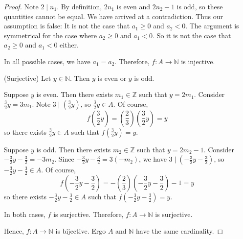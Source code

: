 \documentclass{article}
\newcommand{\Z}{\mathbb{Z}}
\newcommand{\N}{\mathbb{N}}
\theoremstyle{definition}
\begin{document}
\begin{solution}
\begin{proof}
Note $2\mid n_1$. By definition, $2n_1$ is even and $2n_2-1$ is odd, so these quantities cannot be equal. We have arrived at a contradiction. Thus our assumption is false: It is not the case that $a_1\geq 0$ and $a_2<0$. The argument is symmetrical for the case where $a_2\geq 0$ and $a_1<0$. So it is not the case that $a_2\geq 0$ and $a_1<0$ either.\newline

In all possible cases, we have $a_1=a_2$. Therefore, $f:A\to\N$ is injective.\newline

\noindent(Surjective) Let $y\in\N$. Then $y$ is even or $y$ is odd.\newline

Suppose $y$ is even. Then there exists $m_1\in\Z$ such that $y=2m_1$. Consider $\frac{3}{2}y=3m_1$. Note $3\mid\left(\frac{3}{2}y\right)$, so $\frac{3}{2}y\in A$. Of course, \[f\left(\frac{3}{2}y\right)=\left(\frac{2}{3}\right)\left(\frac{3}{2}y\right)=y\] so there exists $\frac{3}{2}y\in A$ such that $f\left(\frac{3}{2}y\right)=y$.\newline

Suppose $y$ is odd. Then there exists $m_2\in\Z$ such that $y=2m_2-1$. Consider $-\frac{3}{2}y-\frac{3}{2}=-3m_2$. Since $-\frac{3}{2}y-\frac{3}{2}=3(-m_2)$, we have $3\mid\left(-\frac{3}{2}y-\frac{3}{2}\right)$, so $-\frac{3}{2}y-\frac{3}{2}\in A$. Of course, \[f\left(-\frac{3}{2}y-\frac{3}{2}\right)=-\left(\frac{2}{3}\right)\left(-\frac{3}{2}y-\frac{3}{2}\right)-1=y\] so there exists $-\frac{3}{2}y-\frac{3}{2}\in A$ such that $f\left(-\frac{3}{2}y-\frac{3}{2}\right)=y$.\newline

In both cases, $f$ is surjective. Therefore, $f:A\to\N$ is surjective.\newline

\noindent Hence, $f:A\to\N$ is bijective. Ergo $A$ and $\N$ have the same cardinality.
\end{proof}
\end{solution}
\end{document}
